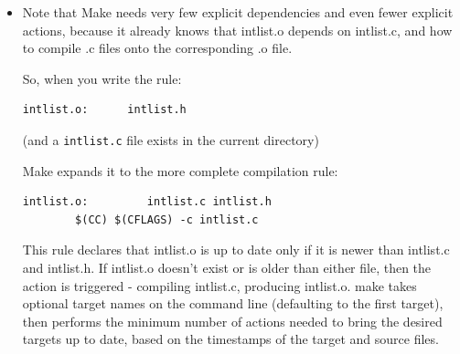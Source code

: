 \documentclass[handout]{beamer}
\begin{document}
\begin{frame}[fragile]

\begin{itemize}
      \item
	Note that Make needs very few explicit dependencies and even fewer explicit actions,
	because it already knows that \alert{intlist.o} depends on \alert{intlist.c},
	and how to compile \alert{.c} files onto the corresponding \alert{.o} file.

      \pitem
      So, when you write the rule:
\begin{verbatim}
intlist.o:      intlist.h
\end{verbatim}

      (and a \verb+intlist.c+ file exists in the current directory)

      \pause
      Make expands it to the more complete compilation rule:

\begin{verbatim}
intlist.o:         intlist.c intlist.h
        $(CC) $(CFLAGS) -c intlist.c
\end{verbatim}

      \pitem
	This rule declares that \alert{intlist.o} is up
	to date only if it is \alert{newer than intlist.c and intlist.h}.
	If \alert{intlist.o doesn't exist} or \alert{is older than either file},
	then the action is triggered - compiling \alert{intlist.c}, producing \alert{intlist.o}.
      \pitem
        \alert{make} takes optional target names on the command line
	(defaulting to the first target),
        then performs the \alert{minimum number of actions}
	needed to bring the desired targets \alert{up to date},
	based on the \alert{timestamps} of the target and source files.
	
%

\end{itemize}

\end{frame}
\end{document}
